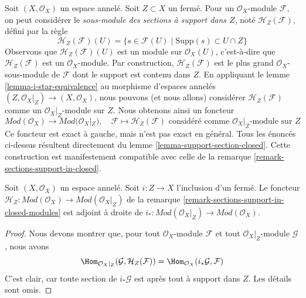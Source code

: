 \begin{remark}
\label{remark-sections-support-in-closed-modules}
Soit $(X, \mathcal{O}_X)$ un espace annelé. Soit $Z \subset X$
un fermé. Pour un $\mathcal{O}_X$-module $\mathcal{F}$, on peut
considérer le {\it sous-module des sections à support dans $Z$}, noté
$\mathcal{H}_Z(\mathcal{F})$, défini par la règle
$$
\mathcal{H}_Z(\mathcal{F})(U) =
\{s \in \mathcal{F}(U) \mid \text{Supp}(s) \subset U \cap Z\}
$$
Observons que $\mathcal{H}_Z(\mathcal{F})(U)$ est un module sur
$\mathcal{O}_X(U)$, c'est-à-dire que $\mathcal{H}_Z(\mathcal{F})$ est un
$\mathcal{O}_X$-module. Par construction, $\mathcal{H}_Z(\mathcal{F})$
est le plus grand $\mathcal{O}_X$-sous-module de $\mathcal{F}$ dont le support est
contenu dans $Z$.
En appliquant le lemme \ref{lemma-i-star-equivalence} au
morphisme d'espaces annelés $(Z, \mathcal{O}_X|_Z) \to (X, \mathcal{O}_X)$, nous
pouvons (et nous allons) considérer
$\mathcal{H}_Z(\mathcal{F})$ comme un $\mathcal{O}_X|_Z$-module sur $Z$.
Nous obtenons ainsi un foncteur
$$
\textit{Mod}(\mathcal{O}_X) \longrightarrow \textit{Mod}(\mathcal{O}_X|_Z),
\quad
\mathcal{F} \longmapsto \mathcal{H}_Z(\mathcal{F})
\text{ considéré comme }\mathcal{O}_X|_Z\text{-module sur }Z
$$
Ce foncteur est exact à gauche, mais n'est pas exact en général.
Tous les énoncés ci-dessus résultent directement du
lemme \ref{lemma-support-section-closed}.
Cette construction est manifestement compatible avec celle de la
remarque \ref{remark-sections-support-in-closed}.
\end{remark}

\begin{lemma}
\label{lemma-adjoint-section-with-support}
Soit $(X, \mathcal{O}_X)$ un espace annelé. Soit $i : Z \to X$
l'inclusion d'un fermé. Le foncteur
$\mathcal{H}_Z : \textit{Mod}(\mathcal{O}_X) \to
\textit{Mod}(\mathcal{O}_X|_Z)$ de la
remarque \ref{remark-sections-support-in-closed-modules}
est adjoint à droite de
$i_* : \textit{Mod}(\mathcal{O}_X|_Z) \to \textit{Mod}(\mathcal{O}_X)$.
\end{lemma}

\begin{proof}
Nous devons montrer que, pour tout $\mathcal{O}_X$-module $\mathcal{F}$
et tout $\mathcal{O}_X|_Z$-module $\mathcal{G}$, nous avons
$$
\Hom_{\mathcal{O}_X|_Z}(\mathcal{G}, \mathcal{H}_Z(\mathcal{F})) =
\Hom_{\mathcal{O}_X}(i_*\mathcal{G}, \mathcal{F})
$$
C'est clair,
car toute section de $i_*\mathcal{G}$ est après tout à support dans $Z$.
Les détails sont omis.
\end{proof}










